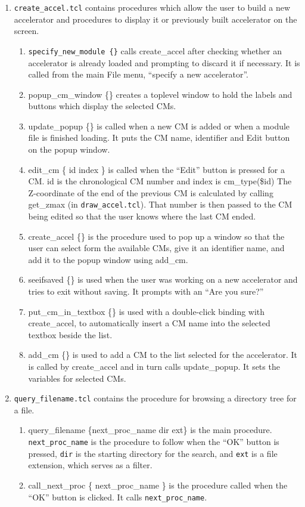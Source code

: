 \documentclass[12pt]{book}
\begin{document}
\begin{enumerate}
\item {\tt create\_accel.tcl} contains procedures which allow the user
to build a new
accelerator and procedures to display it or previously built accelerator
on the screen.
\begin{enumerate}
\item {\tt specify\_new\_module \{\}} calls {\sf create\_accel} after checking
whether an accelerator is already loaded and prompting to discard it if
necessary.  It is called from the main File menu, ``specify a new
accelerator''.
\item {\sf popup\_cm\_window \{\}} creates a toplevel window to hold the
labels and buttons which display the selected CMs.
\item {\sf update\_popup \{\}} is called when a new CM is added or when a
module file is finished loading.  It puts the CM name, identifier and
Edit button on the popup window.
\item {\sf edit\_cm \{ id index \}} is called when the ``Edit'' button is
pressed for a CM.  id is the chronological CM number and index is cm\_type(\$id)
The Z-coordinate of the end of the previous CM is calculated by calling
{\sf get\_zmax} (in {\tt draw\_accel.tcl}).  That number is then passed
to the CM being edited so that the user knows where the last CM ended.
\item {\sf create\_accel \{\}} is the procedure used to pop up a window so
that the user can select form the available CMs, give it an identifier
name, and add it to the popup window using {\sf add\_cm}.
\item {\sf seeifsaved \{\}} is used when the user was working on a new
accelerator and tries to exit without saving.  It prompts with an ``Are
you sure?''
\item {\sf put\_cm\_in\_textbox \{\}} is used with a double-click binding
with {\sf create\_accel}, to automatically insert a CM name into the selected
textbox beside the list.
\item {\sf add\_cm \{\}} is used to add a CM to the list selected for the
accelerator.  It is called by {\sf create\_accel} and in turn calls
{\sf update\_popup}.  It sets the variables for selected CMs.
\end{enumerate}

\item {\tt query\_filename.tcl} contains the procedure for browsing a
directory tree for a file.
\begin{enumerate}
\item {\sf query\_filename \{next\_proc\_name dir ext\}} is the main
procedure. {\tt next\_proc\_name} is the procedure to follow when the
``OK'' button is pressed,  {\tt dir} is the starting directory for the search,
and {\tt ext} is a file extension, which serves as a filter.
\item {\sf call\_next\_proc \{ next\_proc\_name \}} is the procedure called
when the ``OK'' button is clicked.  It calls {\tt next\_proc\_name}.
\end{enumerate}


\end{enumerate}
\end{document}
